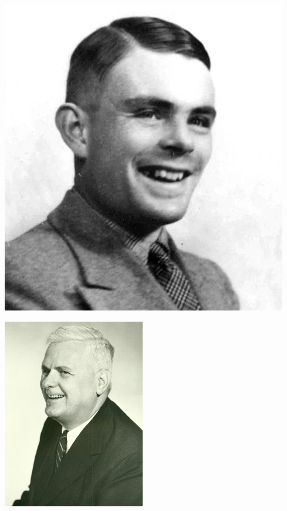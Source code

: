 \documentclass[mathserif]{beamer}
\begin{document}
\begin{frame}
\begin{multicols}{3}
    \includegraphics[width=0.9\linewidth]{media/turing.jpg}

    \includegraphics[width=0.9\linewidth]{media/church.jpg}
  \end{multicols}
\end{frame}
\end{document}

